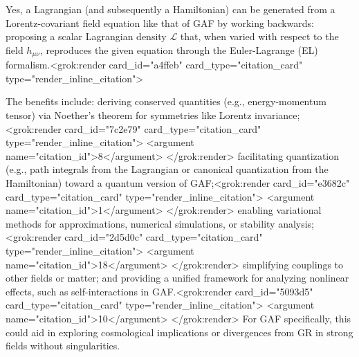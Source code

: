 Yes, a Lagrangian (and subsequently a Hamiltonian) can be generated from a Lorentz-covariant field equation like that of GAF by working backwards: proposing a scalar Lagrangian density \(\mathcal{L}\) that, when varied with respect to the field \(h_{\mu\nu}\), reproduces the given equation through the Euler-Lagrange (EL) formalism.<grok:render card_id="a4ffeb" card_type="citation_card" type="render_inline_citation">

The benefits include: deriving conserved quantities (e.g., energy-momentum tensor) via Noether's theorem for symmetries like Lorentz invariance;<grok:render card_id="7c2e79" card_type="citation_card" type="render_inline_citation">
<argument name="citation_id">8</argument>
</grok:render> facilitating quantization (e.g., path integrals from the Lagrangian or canonical quantization from the Hamiltonian) toward a quantum version of GAF;<grok:render card_id="e3682c" card_type="citation_card" type="render_inline_citation">
<argument name="citation_id">1</argument>
</grok:render> enabling variational methods for approximations, numerical simulations, or stability analysis;<grok:render card_id="2d5d0c" card_type="citation_card" type="render_inline_citation">
<argument name="citation_id">18</argument>
</grok:render> simplifying couplings to other fields or matter; and providing a unified framework for analyzing nonlinear effects, such as self-interactions in GAF.<grok:render card_id="5093d5" card_type="citation_card" type="render_inline_citation">
<argument name="citation_id">10</argument>
</grok:render> For GAF specifically, this could aid in exploring cosmological implications or divergences from GR in strong fields without singularities.